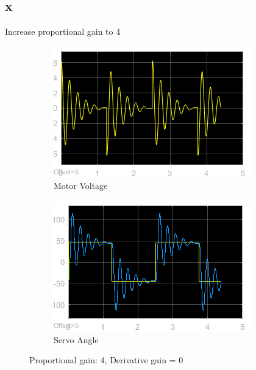 \documentclass[12pt]{article}
\begin{document}
\subsection*{x} %
Increase proportional gain to 4
\begin{figure}[h!]
    \centering
    \begin{subfigure}[b]{0.49\textwidth}
        \includegraphics[width=\textwidth]{x_voltage}
        \caption{Motor Voltage}
    \end{subfigure}
    \begin{subfigure}[b]{0.49\textwidth}
        \includegraphics[width=\textwidth]{x_angle}
        \caption{Servo Angle}
    \end{subfigure}
    \caption{\label{fig:x} Proportional gain: 4, Derivative gain = 0}
\end{figure}
\end{document}
